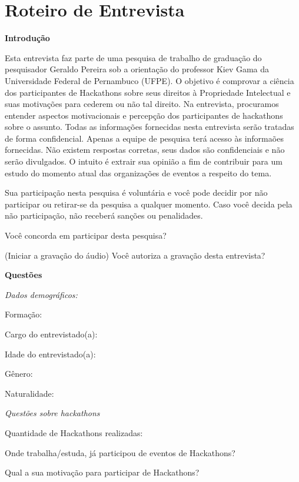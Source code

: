 \chapter{Roteiro de Entrevista}
\label{ap:entrevista}

\vspace{4mm}

\textbf{Introdução}

Esta entrevista faz parte de uma pesquisa de trabalho de graduação do pesquisador Geraldo Pereira sob a orientação do professor Kiev Gama da Universidade Federal de Pernambuco (UFPE). O objetivo é comprovar a ciência dos participantes de Hackathons sobre seus direitos à Propriedade Intelectual e suas motivações para cederem ou não tal direito. Na entrevista, procuramos entender aspectos motivacionais e percepção dos participantes de hackathons sobre o assunto.
Todas as informações fornecidas nesta entrevista serão tratadas de forma confidencial. Apenas a equipe de pesquisa terá acesso às informaões fornecidas. 
Não existem respostas corretas, seus dados são confidenciais e não serão divulgados. O intuito é extrair sua opinião a fim de contribuir para um estudo do momento atual das organizações de eventos a respeito do tema.

Sua participação nesta pesquisa é voluntária e você pode decidir por não participar ou retirar-se da pesquisa a qualquer momento. Caso você decida pela não participação, não receberá sanções ou penalidades.

Você concorda em participar desta pesquisa?

(Iniciar a gravação do áudio)
Você autoriza a gravação desta entrevista?
\vspace{4mm}

\textbf{Questões}

\textit{Dados demográficos:}

Formação:

Cargo do entrevistado(a):

Idade do entrevistado(a):

Gênero:

Naturalidade:

\vspace{4mm}
\textit{Questões sobre hackathons}

Quantidade de Hackathons realizadas:

Onde trabalha/estuda, já participou de eventos de Hackathons? 

Qual a sua motivação para participar de Hackathons?

